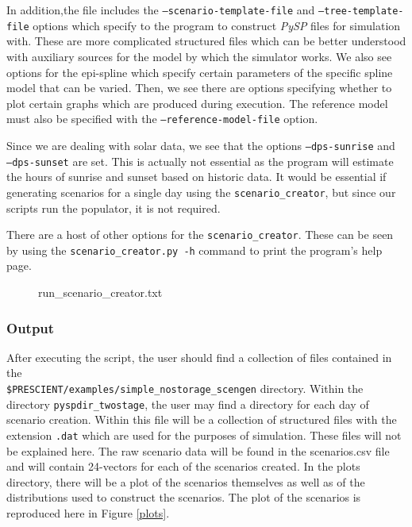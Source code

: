 \documentclass[11pt]{article}
\begin{document}
In addition,the file includes the \texttt{--scenario-template-file} and \texttt{--tree-template-file} options which specify to the program to construct \textit{PySP} files for simulation with. These are more complicated structured files which can be better understood with auxiliary sources for the model by which the simulator works. We also see options for the epi-spline which specify certain parameters of the specific spline model that can be varied. Then, we see there are options specifying whether to plot certain graphs which are produced during execution. The reference model must also be specified with the \texttt{--reference-model-file} option.

Since we are dealing with solar data, we see that the options \texttt{--dps-sunrise} and\\ \texttt{--dps-sunset} are set. This is actually not essential as the program will estimate the hours of sunrise and sunset based on historic data. It would be essential if generating scenarios for a single day using the \texttt{scenario\_creator}, but since our scripts run the populator, it is not required.

There are a host of other options for the \texttt{scenario\_creator}. These can be seen by using the \texttt{scenario\_creator.py -h} command to print the program's help page.

\begin{figure}
	\begin{framed}
		
	\end{framed}
	\caption{run\_scenario\_creator.txt}
	\label{BPA_scenario_creator}
\end{figure}

\subsubsection{Output}
After executing the script, the user should find a collection of files contained in the \\ \texttt{\$PRESCIENT/examples/simple\_nostorage\_scengen} directory. Within the directory \texttt{pyspdir\_twostage}, the user may find a directory for each day of scenario creation. Within this file will be a collection of structured files with the extension \texttt{.dat} which are used for the purposes of simulation. These files will not be explained here. The raw scenario data will be found in the scenarios.csv file and will contain 24-vectors for each of the scenarios created. In the plots directory, there will be a plot of the scenarios themselves as well as of the distributions used to construct the scenarios. The plot of the scenarios is reproduced here in Figure \ref{plots}.
\end{document}
